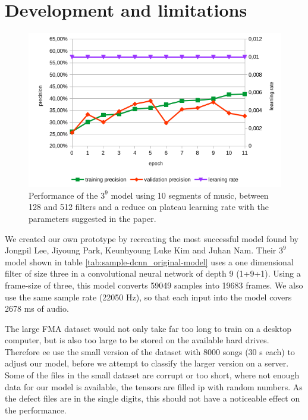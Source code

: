 \section{Development and limitations}
\label{sec:development}

\begin{figure}[!htb]
	\centering
	\includegraphics[width=.9\linewidth]{images/sample-dcnn-m3-n9-seg10-128_512-plateau.png}
	\caption{Performance of the $3^9$ model using 10 segments of music, between 128 and 512 filters and a reduce on plateau learning rate with the parameters suggested in the paper.}
	\label{fig:sample-dcnn-m3-n9-seg10-128_512-plateau}
\end{figure}


We created our own prototype by recreating the most successful model found by Jongpil Lee, Jiyoung Park, Keunhyoung Luke Kim and Juhan Nam. Their $3^9$ model shown in table \ref{tab:sample-dcnn_original-model} uses a one dimensional filter of size three in a convolutional neural network of depth 9 (1+9+1).  Using a frame-size of three, this model converts 59049 samples into 19683 frames. We also use the same sample rate (22050 Hz), so that each input into the model covers 2678 ms of audio.

The large FMA dataset would not only take far too long to train on a desktop computer, but is also too large to be stored on the available hard drives. Therefore ee use the small version of the dataset with 8000 songs (30 s each) to adjust our model, before we attempt to classify the larger version on a server. Some of the files in the small dataset are corrupt or too short, where not enough data for our model is available, the tensors are filled ip with random numbers. As the defect files are in the single digits, this should not have a noticeable effect on the performance.

